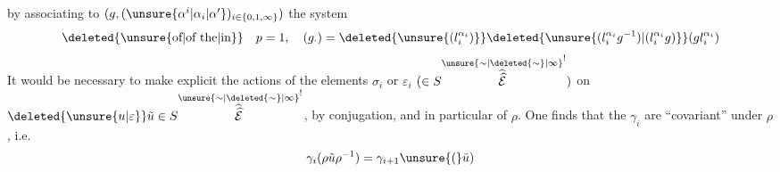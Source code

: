 by associating to $(g,(\unsure{\alpha^i|\alpha_i|\alpha'})_{i\in\{0,1,\infty\}})$ the system
\[
\deleted{\text{\unsure{of|of the|in}}}\quad p=1,\quad(g_\cdot)=\deleted{\unsure{(l_i^{\alpha_i})}}\deleted{\unsure{(l_i^{\alpha_i}g^{-1})|(l_i^{\alpha_i}g)}}(gl_i^{\alpha_i})
\]
It would be necessary to make explicit the actions of the elements $\sigma_i$ or $\varepsilon_i$  $(\in S\overset{\unsure{\sim|\deleted{\sim}|\infty}}{\widehat{\widehat{\mathcal E}}}^{!})$ on $\deleted{\unsure{u|\varepsilon}}\tilde u\in S\overset{\unsure{\sim|\deleted{\sim}|\infty}}{\widehat{\widehat{\mathcal E}}}^{!}$, by  conjugation, and in particular of $\rho$. One finds that  the $\gamma_i$ are ``covariant'' under $\rho$, i.e.
\[
\gamma_i(\rho\tilde u\rho^{-1})=\gamma_{i+1}\unsure{(}\bar u)
\]
